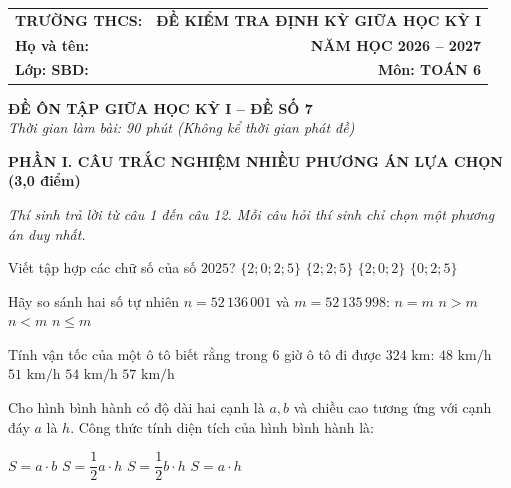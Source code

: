 \documentclass[12pt,a4paper]{article}
\begin{document}
\noindent
\begin{tabularx}{\linewidth}{X r}
\textbf{TRƯỜNG THCS: \dotfill} & \textbf{ĐỀ KIỂM TRA ĐỊNH KỲ GIỮA HỌC KỲ I} \\
\textbf{Họ và tên: \dotfill} & \textbf{NĂM HỌC 2026 -- 2027} \\
\textbf{Lớp: \dotfill \quad SBD: \dotfill} & \textbf{Môn: TOÁN 6} \\
\hline
\end{tabularx}
\vspace{2mm}

\begin{center}
  \textbf{\large ĐỀ ÔN TẬP GIỮA HỌC KỲ I -- ĐỀ SỐ 7}\\
  \textit{Thời gian làm bài: 90 phút (Không kể thời gian phát đề)}
\end{center}
\vspace{1mm}

\noindent\textbf{\large PHẦN I. CÂU TRẮC NGHIỆM NHIỀU PHƯƠNG ÁN LỰA CHỌN (3,0 điểm)}

\textit{Thí sinh trả lời từ câu 1 đến câu 12. Mỗi câu hỏi thí sinh chỉ chọn một phương án duy nhất.}

\vspace{1mm}
\begin{ex}
Viết tập hợp các chữ số của số $2025$?
\choice
{$\{2; 0; 2; 5\}$}
{$\{2; 2; 5\}$}
{$\{2; 0; 2\}$}
{\True $\{0; 2; 5\}$}
\end{ex}

\begin{ex}
Hãy so sánh hai số tự nhiên $n = 52\,136\,001$ và $m = 52\,135\,998$:
\choice
{$n = m$}
{\True $n > m$}
{$n < m$}
{$n \le m$}
\end{ex}

\begin{ex}
Tính vận tốc của một ô tô biết rằng trong $6$ giờ ô tô đi được $324\text{ km}$:
\choice
{$48\text{ km/h}$}
{$51\text{ km/h}$}
{\True $54\text{ km/h}$}
{$57\text{ km/h}$}
\end{ex}

\begin{ex}
Cho hình bình hành có độ dài hai cạnh là $a, b$ và chiều cao tương ứng với cạnh đáy $a$ là $h$. Công thức tính diện tích của hình bình hành là:
\begin{center}
\end{center}
\choice
{$S = a \cdot b$}
{$S = \dfrac{1}{2} a \cdot h$}
{$S = \dfrac{1}{2} b \cdot h$}
{\True $S = a \cdot h$}
\end{ex}
\end{document}
